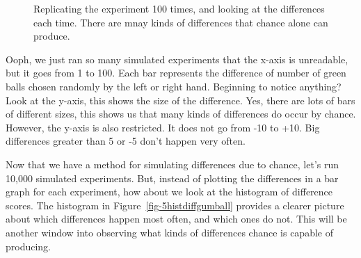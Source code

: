 \documentclass[
  letterpaper,
  DIV=11,
  numbers=noendperiod]{scrreprt}
\begin{document}
\begin{figure}


\caption{\label{fig-5manydiffs}Replicating the experiment 100 times, and
looking at the differences each time. There are mnay kinds of
differences that chance alone can produce.}

\end{figure}%

Ooph, we just ran so many simulated experiments that the x-axis is
unreadable, but it goes from 1 to 100. Each bar represents the
difference of number of green balls chosen randomly by the left or right
hand. Beginning to notice anything? Look at the y-axis, this shows the
size of the difference. Yes, there are lots of bars of different sizes,
this shows us that many kinds of differences do occur by chance.
However, the y-axis is also restricted. It does not go from -10 to +10.
Big differences greater than 5 or -5 don't happen very often.

Now that we have a method for simulating differences due to chance,
let's run 10,000 simulated experiments. But, instead of plotting the
differences in a bar graph for each experiment, how about we look at the
histogram of difference scores. The histogram in
Figure~\ref{fig-5histdiffgumball} provides a clearer picture about which
differences happen most often, and which ones do not. This will be
another window into observing what kinds of differences chance is
capable of producing.
\end{document}
